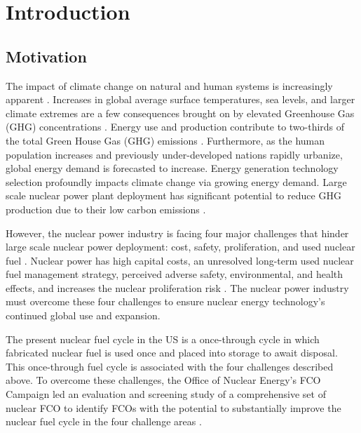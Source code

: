 \chapter[Introduction]{Introduction}
\label{chap:1}

\section{Motivation}
The impact of climate change on natural and human systems 
is increasingly apparent \cite{noauthor_climate_2018}.
Increases in global average 
surface temperatures, sea levels, and larger climate extremes
are a few consequences brought on by elevated Greenhouse Gas (GHG) 
concentrations \cite{noauthor_climate_2018}.
Energy use and production contribute to 
two-thirds of the total Green House Gas (GHG) 
emissions \cite{noauthor_climate_2018}.
Furthermore, as the human population increases and previously 
under-developed nations rapidly urbanize, 
global energy demand is forecasted to increase.  
Energy generation technology selection 
profoundly impacts climate change via growing energy demand. 
Large scale nuclear power plant deployment has significant 
potential to reduce GHG production due to their low 
carbon emissions \cite{noauthor_climate_2018}.  

However, the nuclear power industry is facing four major challenges 
that hinder large scale nuclear power deployment: 
cost, safety, proliferation, and used nuclear fuel 
\cite{massachusetts_institute_of_technology_future_2003}. 
Nuclear power has high capital costs, an unresolved 
long-term used nuclear fuel management strategy, perceived adverse safety, 
environmental, and health effects, and increases the nuclear proliferation risk
\cite{massachusetts_institute_of_technology_future_2003}. 
The nuclear power industry must overcome these four challenges 
to ensure nuclear energy technology's continued global use and expansion.

The present nuclear fuel cycle in the \gls{US} is a once-through cycle 
in which fabricated nuclear fuel is used once and placed into 
storage to await disposal. 
This once-through fuel cycle is associated with the four
challenges described above.
To overcome these challenges, the Office of Nuclear Energy's
\gls{FCO} Campaign led an evaluation 
and screening study of a comprehensive set of nuclear \gls{FCO} 
to identify \glspl{FCO} with the potential to substantially 
improve the nuclear fuel cycle in the four challenge areas
\cite{wigeland_nuclear_2014}. 

